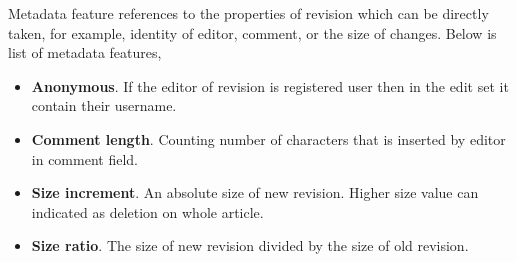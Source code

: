 Metadata feature references to the properties of revision which can be directly
taken, for example, identity of editor, comment, or the size of changes.
Below is list of metadata features,
\begin{itemize}
\item \textbf{Anonymous}. If the editor of revision is registered user then in
the edit set it contain their username.
\item \textbf{Comment length}. Counting number of characters that is inserted by
editor in comment field.
\item \textbf{Size increment}. An absolute size of new revision. Higher size
value can indicated as deletion on whole article.
\item \textbf{Size ratio}. The size of new revision divided by the size of old
revision.
\end{itemize}
